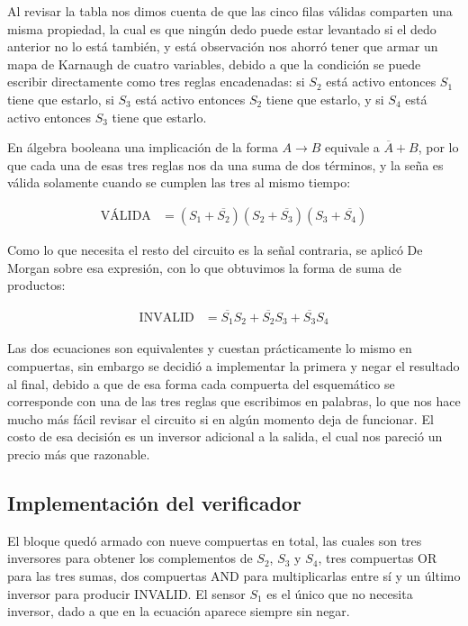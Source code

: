 \documentclass[12pt]{article}
\begin{document}
Al revisar la tabla nos dimos cuenta de que las cinco filas válidas comparten una
misma propiedad, la cual es que ningún dedo puede estar levantado si el dedo
anterior no lo está también, y está observación nos ahorró tener que armar un mapa
de Karnaugh de cuatro variables, debido a que la condición se puede escribir
directamente como tres reglas encadenadas: si $S_2$ está activo entonces $S_1$
tiene que estarlo, si $S_3$ está activo entonces $S_2$ tiene que estarlo, y si
$S_4$ está activo entonces $S_3$ tiene que estarlo.

En álgebra booleana una implicación de la forma $A \rightarrow B$ equivale a
$\overline{A} + B$, por lo que cada una de esas tres reglas nos da una suma de dos
términos, y la seña es válida solamente cuando se cumplen las tres al mismo
tiempo:

\begin{align*}
\text{VÁLIDA} &= (S_1 + \overline{S_2})(S_2 + \overline{S_3})(S_3 + \overline{S_4})
\end{align*}

Como lo que necesita el resto del circuito es la señal contraria, se aplicó De
Morgan sobre esa expresión, con lo que obtuvimos la forma de suma de productos:

\begin{align*}
\text{INVALID} &= \overline{S_1} S_2 + \overline{S_2} S_3 + \overline{S_3} S_4
\end{align*}

Las dos ecuaciones son equivalentes y cuestan prácticamente lo mismo en
compuertas, sin embargo se decidió a implementar la primera y negar el resultado
al final, debido a que de esa forma cada compuerta del esquemático se corresponde
con una de las tres reglas que escribimos en palabras, lo que nos hace mucho más
fácil revisar el circuito si en algún momento deja de funcionar. El costo de esa
decisión es un inversor adicional a la salida, el cual nos pareció un precio más
que razonable.

\subsection{Implementación del verificador}

El bloque quedó armado con nueve compuertas en total, las cuales son tres
inversores para obtener los complementos de $S_2$, $S_3$ y $S_4$, tres compuertas
OR para las tres sumas, dos compuertas AND para multiplicarlas entre sí y un
último inversor para producir INVALID. El sensor $S_1$ es el único que no necesita
inversor, dado a que en la ecuación aparece siempre sin negar.
\end{document}
